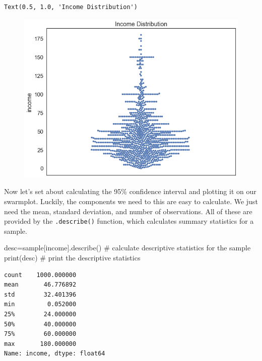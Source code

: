 \documentclass[
  letterpaper,
  DIV=11,
  numbers=noendperiod]{scrreprt}
\newenvironment{Shaded}{\begin{snugshade}}{\end{snugshade}}
\newcommand{\BuiltInTok}[1]{\textcolor[rgb]{0.00,0.23,0.31}{#1}}
\newcommand{\CommentTok}[1]{\textcolor[rgb]{0.37,0.37,0.37}{#1}}
\newcommand{\NormalTok}[1]{\textcolor[rgb]{0.00,0.23,0.31}{#1}}
\newcommand{\OperatorTok}[1]{\textcolor[rgb]{0.37,0.37,0.37}{#1}}
\newcommand{\StringTok}[1]{\textcolor[rgb]{0.13,0.47,0.30}{#1}}
\begin{document}
\begin{verbatim}
Text(0.5, 1.0, 'Income Distribution')
\end{verbatim}

\begin{figure}[H]

{\centering \includegraphics{notebooks/W07. Hypothesis Testing_files/figure-pdf/cell-5-output-2.png}

}

\end{figure}

Now let's set about calculating the 95\% confidence interval and
plotting it on our swarmplot. Luckily, the components we need to this
are easy to calculate. We just need the mean, standard deviation, and
number of observations. All of these are provided by the
\texttt{.describe()} function, which calculates summary statistics for a
sample.

\begin{Shaded}
\begin{Highlighting}[]
\NormalTok{desc}\OperatorTok{=}\NormalTok{sample[}\StringTok{\textquotesingle{}income\textquotesingle{}}\NormalTok{].describe() }\CommentTok{\# calculate descriptive statistics for the sample}
\BuiltInTok{print}\NormalTok{(desc) }\CommentTok{\# print the descriptive statistics}
\end{Highlighting}
\end{Shaded}

\begin{verbatim}
count    1000.000000
mean       46.776892
std        32.401396
min         0.052000
25%        24.000000
50%        40.000000
75%        60.000000
max       180.000000
Name: income, dtype: float64
\end{verbatim}
\end{document}
